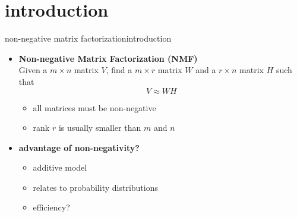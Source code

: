     \section[intro]{introduction}
        \begin{frame}{non-negative matrix factorization}{introduction}
            \begin{itemize}
                \item   \textbf{Non-negative Matrix Factorization (NMF)}\\
                Given a $m \times n$ matrix $V$, find a $m \times r$ matrix $W$ and a $r \times n$ matrix $H$ such that
                \begin{equation*}
                V \approx WH
                \end{equation*}
                \begin{itemize}
                		\item all matrices must be non-negative
                		\item rank $r$ is usually smaller than $m$ and $n$
                \end{itemize}
              		                
                \bigskip
                \item<2->   \textbf{advantage of non-negativity?}
                    \begin{itemize}
                        \item<2->   additive model
                        \item<3->   relates to probability distributions
                        \item<4->   efficiency?
                    \end{itemize}
            \end{itemize}
        \end{frame}    
        
